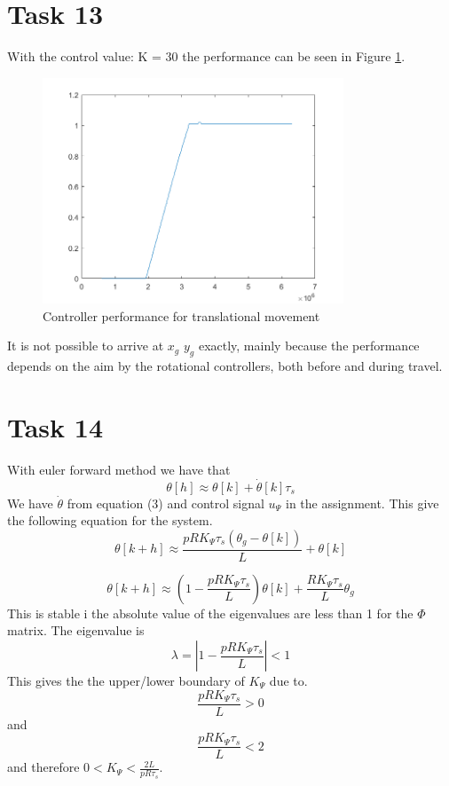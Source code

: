 \documentclass[a4paper,12pt,oneside,onecolumn]{article} %
\begin{document}
\section*{Task 13}
With the control value:
K = 30
the performance can be seen in Figure \ref{13}.
\begin{figure}[H]
\begin{center}	
  \includegraphics[width = 0.8\textwidth]{task13.png}
  \caption{Controller performance for translational movement}\label{13}
 \end{center}
\end{figure}

It is not possible to arrive at $x_g$ $y_g$ exactly, mainly because the performance depends on the aim by the rotational controllers, both before and during travel. 
\section*{Task 14}


With euler forward method we have that
\begin{equation*}
\theta[h]\approx \theta[k]+\dot{\theta}[k]\tau_s
\end{equation*}
We have $\dot{\theta}$ from equation (3) and control signal $u_\Psi$ in the assignment. This give the following equation for the system.
\begin{equation*}
\theta[k+h]\approx  \frac{p R K_\Psi \tau_s(\theta_g-\theta[k])}{L}+\theta[k]
\end{equation*}

\begin{equation*}
\theta[k+h]\approx  (1-\frac{p R K_\Psi \tau_s}{L})\theta[k]+\frac{R K_\Psi \tau_s}{L}\theta_g
\end{equation*}
This is stable i the absolute value of the eigenvalues are less than 1 for the $\Phi$ matrix. The eigenvalue is
\begin{equation*}
\lambda = |1-\frac{p R K_\Psi \tau_s}{L}|<1
\end{equation*}
This gives the the upper/lower boundary of $K_\Psi$ due to.
\begin{equation*}
\frac{p R K_\Psi \tau_s}{L}>0
\end{equation*}
and
\begin{equation*}
\frac{p R K_\Psi \tau_s}{L}<2
\end{equation*}
and therefore $0<K_\Psi<\frac{2 L }{p R \tau_s}$.
\end{document}
